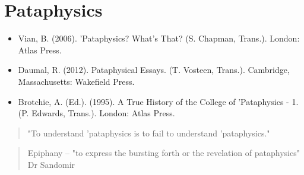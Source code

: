 
\chapter{Pataphysics}
\label{ch:pataphysics}

\begin{itemize}
  \item Vian, B. (2006). 'Pataphysics? What's That? (S. Chapman, Trans.). London: Atlas Press.\citep{Vian2006}\\
  \item Daumal, R. (2012). Pataphysical Essays. (T. Vosteen, Trans.). Cambridge, Massachusetts: Wakefield Press.\citep{Daumal2012}\\
  \item Brotchie, A. (Ed.). (1995). A True History of the College of  'Pataphysics - 1. (P. Edwards, Trans.). London: Atlas Press.\citep{Brotchie1995}
\end{itemize}

\begin{quote}
  "To understand 'pataphysics is to fail to understand 'pataphysics." \citep{Hugill2012a}
\end{quote}

\begin{quote}
  Epiphany – "to express the bursting forth or the revelation of pataphysics" Dr Sandomir \citep[p.174]{Hugill2012a}
\end{quote}

